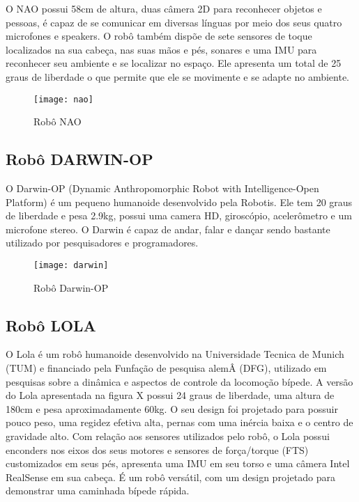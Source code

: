 O NAO possui 58cm de altura, duas câmera 2D para reconhecer objetos e pessoas, é capaz de se comunicar em diversas línguas por meio dos seus quatro microfones e speakers. O robô também dispõe de sete sensores de toque localizados na sua cabeça, nas suas mãos e pés, sonares e uma IMU para reconhecer seu ambiente e se localizar no espaço. Ele apresenta um total de 25 graus de liberdade o que permite que ele se movimente e se adapte no ambiente.

\begin{figure} [H]	
    \centering
    \caption{Robô NAO}
    \texttt{[image: nao]}
    \label{fig:nao}
\end{figure}

\subsection{Robô DARWIN-OP}
\label{ssec:darwin}

O Darwin-OP (Dynamic Anthropomorphic Robot with Intelligence-Open Platform)  é um pequeno humanoide desenvolvido pela Robotis. Ele tem 20 graus de liberdade e pesa 2.9kg, possui uma camera HD, giroscópio, acelerômetro e um microfone stereo. O Darwin é capaz de andar, falar e dançar sendo bastante utilizado por pesquisadores e programadores.

\begin{figure} [H]
    \centering
    \caption{Robô Darwin-OP}
    \texttt{[image: darwin]}
    \label{fig:darwin}
\end{figure}

\subsection{Robô LOLA}
\label{ssec:lola}

O Lola é um robô humanoide desenvolvido na Universidade Tecnica de Munich (TUM) e financiado pela Funfação de pesquisa alemÂ (DFG), utilizado em pesquisas sobre a dinâmica e aspectos de controle da locomoção bípede. A versão do Lola apresentada na figura X possui 24 graus de liberdade, uma altura de 180cm e pesa aproximadamente 60kg. O seu design foi projetado para possuir pouco peso, uma regidez efetiva alta, pernas com uma inércia baixa e o centro de gravidade alto. Com relação aos sensores utilizados pelo robô, o Lola possui enconders nos eixos dos seus motores e sensores de força/torque (FTS) customizados em seus pés, apresenta uma IMU em seu torso e uma câmera Intel RealSense em sua cabeça. É um robô versátil, com um design projetado para demonstrar uma caminhada bípede rápida.

